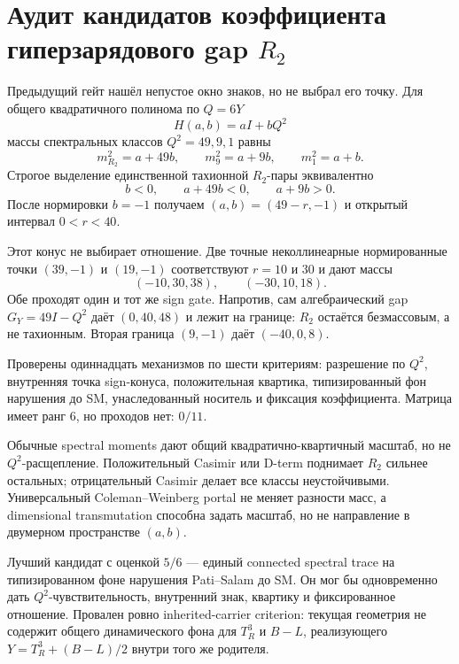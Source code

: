 \chapter{Аудит кандидатов коэффициента гиперзарядового gap
\texorpdfstring{$R_2$}{R2}}
\label{ch:v10-h15-r2-hypercharge-gap-coefficient-audit}

Предыдущий гейт нашёл непустое окно знаков, но не выбрал его точку. Для
общего квадратичного полинома по $Q=6Y$
\begin{equation}
 H(a,b)=aI+bQ^2
\end{equation}
массы спектральных классов $Q^2=49,9,1$ равны
\begin{equation}
 m_{R_2}^2=a+49b,\qquad
 m_9^2=a+9b,\qquad
 m_1^2=a+b.
\end{equation}
Строгое выделение единственной тахионной $R_2$-пары эквивалентно
\begin{equation}
 \boxed{b<0,\qquad a+49b<0,\qquad a+9b>0.}
\end{equation}
После нормировки $b=-1$ получаем $(a,b)=(49-r,-1)$ и открытый интервал
$0<r<40$.

Этот конус не выбирает отношение. Две точные неколлинеарные нормированные
точки $(39,-1)$ и $(19,-1)$ соответствуют $r=10$ и $30$ и дают массы
\begin{equation}
 (-10,30,38),\qquad (-30,10,18).
\end{equation}
Обе проходят один и тот же sign gate. Напротив, сам алгебраический gap
$G_Y=49I-Q^2$ даёт $(0,40,48)$ и лежит на границе: $R_2$ остаётся
безмассовым, а не тахионным. Вторая граница $(9,-1)$ даёт $(-40,0,8)$.

Проверены одиннадцать механизмов по шести критериям: разрешение по $Q^2$,
внутренняя точка sign-конуса, положительная квартика, типизированный фон
нарушения до SM, унаследованный носитель и фиксация коэффициента. Матрица
имеет ранг $6$, но проходов нет: $0/11$.

Обычные spectral moments дают общий квадратично-квартичный масштаб, но не
$Q^2$-расщепление. Положительный Casimir или D-term поднимает $R_2$ сильнее
остальных; отрицательный Casimir делает все классы неустойчивыми.
Универсальный Coleman--Weinberg portal не меняет разности масс, а
dimensional transmutation способна задать масштаб, но не направление в
двумерном пространстве $(a,b)$.

Лучший кандидат с оценкой $5/6$ --- единый connected spectral trace на
типизированном фоне нарушения Pati--Salam до SM. Он мог бы одновременно
дать $Q^2$-чувствительность, внутренний знак, квартику и фиксированное
отношение. Провален ровно inherited-carrier criterion: текущая геометрия не
содержит общего динамического фона для $T^3_R$ и $B-L$, реализующего
$Y=T^3_R+(B-L)/2$ внутри того же родителя.

